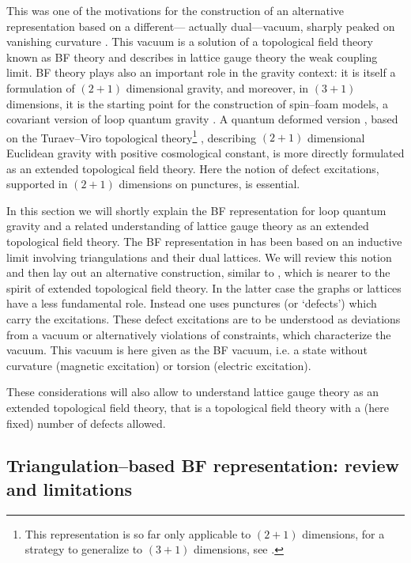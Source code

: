 \documentclass[nofootinbib,superscriptaddress,eqsecnum,tightenlines,11pt]{revtex4-1}
\begin{document}
This was one of the motivations for the construction of an alternative representation based on a different--- actually dual---vacuum, sharply peaked on vanishing curvature \cite{DG14a,DG14b,BDG15}.  This vacuum is a solution of a topological field theory known as BF theory and describes in lattice gauge theory the weak coupling limit.  BF theory plays also an important role in the gravity context: it is itself a formulation of $(2+1)$ dimensional gravity, and moreover, in $(3+1)$ dimensions, it is the starting point for the construction of spin--foam models, a covariant version of loop quantum gravity \cite{AlexReview}.
A quantum deformed version \cite{DG16}, based on the Turaev--Viro topological theory\footnote{This representation is so far only applicable to $(2+1)$ dimensions, for a strategy to generalize to $(3+1)$ dimensions, see \cite{DelDitt}.} \cite{TV}, describing $(2+1)$ dimensional Euclidean gravity with positive cosmological constant, is more directly formulated as an extended topological field theory. Here the notion of defect excitations, supported in $(2+1)$ dimensions on punctures, is essential.   

In this section we will shortly explain the BF representation for loop quantum gravity and a related understanding of lattice gauge theory as an extended topological field theory. The BF representation in \cite{DG14a,DG14b,BDG15} has been based on an inductive limit involving triangulations and their dual lattices. We will review this notion and then lay out an alternative construction, similar to \cite{DG16}, which is nearer to the spirit of extended topological field theory. In the latter case the graphs or lattices have a  less fundamental role.  Instead one  uses punctures (or `defects') which carry the  excitations.  These defect excitations are to be understood as deviations from a vacuum or alternatively violations of constraints, which characterize the vacuum. This vacuum  is here given as the BF vacuum, i.e. a state without curvature (magnetic excitation) or torsion (electric excitation). 

These considerations will also allow to understand lattice gauge theory as an extended topological field theory, that is a topological field theory with a (here fixed) number of defects allowed. 





\subsection{Triangulation--based BF representation: review and limitations}
\end{document}

